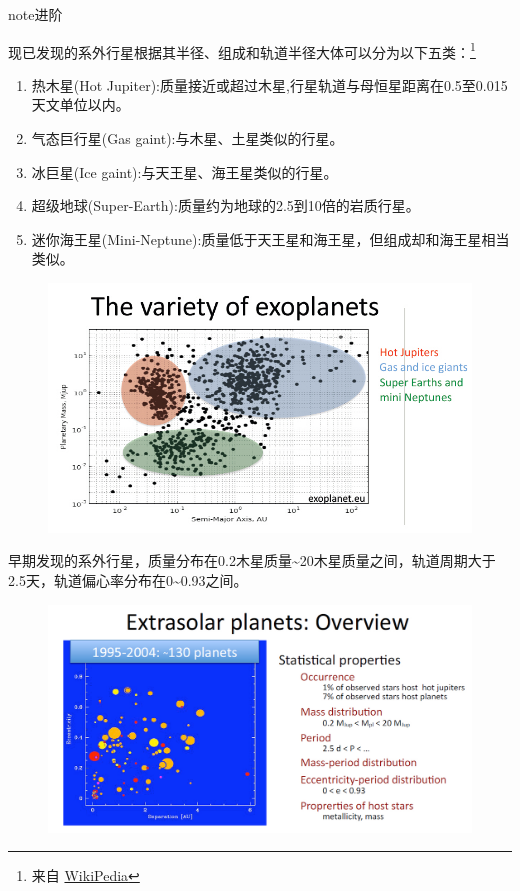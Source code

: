 \documentclass[letterpaper,10pt,english]{sphinxmanual}
\begin{document}
\begin{notice}{note}{进阶}

现已发现的系外行星根据其半径、组成和轨道半径大体可以分为以下五类：\footnote{
来自 \href{http://zh.wikipedia.org/wiki/Template:\%E7\%B3\%BB\%E5\%A4\%96\%E8\%A1\%8C\%E6\%98\%9F}{WikiPedia}
}
\begin{enumerate}
\item {} 
热木星(Hot Jupiter):质量接近或超过木星,行星轨道与母恒星距离在0.5至0.015天文单位以内。

\item {} 
气态巨行星(Gas gaint):与木星、土星类似的行星。

\item {} 
冰巨星(Ice gaint):与天王星、海王星类似的行星。

\item {} 
超级地球(Super-Earth):质量约为地球的2.5到10倍的岩质行星。

\item {} 
迷你海王星(Mini-Neptune):质量低于天王星和海王星，但组成却和海王星相当类似。

\end{enumerate}
\begin{figure}[htbp]
\centering

\includegraphics{The_variety_of_exoplanets.jpg}
\end{figure}

早期发现的系外行星，质量分布在0.2木星质量\textasciitilde{}20木星质量之间，轨道周期大于2.5天，轨道偏心率分布在0\textasciitilde{}0.93之间。
\begin{figure}[htbp]
\centering

\includegraphics{Extrasolar_planets.jpg}
\end{figure}
\end{notice}
\end{document}
